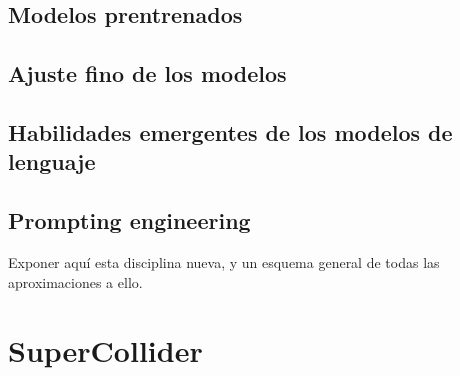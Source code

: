 \subsection{Modelos prentrenados}
\subsection{Ajuste fino de los modelos}
\subsection{Habilidades emergentes de los modelos de lenguaje}
\subsection{Prompting engineering}
Exponer aquí esta disciplina nueva, y un esquema general de todas las aproximaciones a ello. \citep{LLMPromptingGuide}

\section{SuperCollider}

